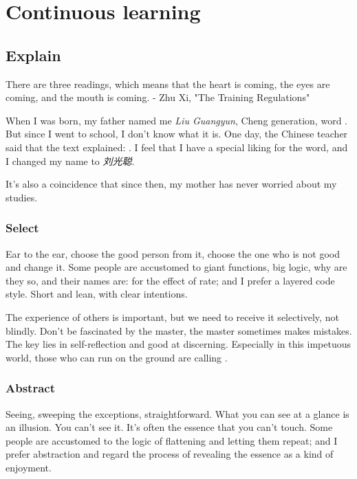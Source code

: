 \chapter{Continuous learning} 
\label{ch:learning}


\section{Explain}
\begin{content}

\begin{remark}
There are three readings, which means that the heart is coming, the eyes are coming, and the mouth is coming. - Zhu Xi, "The Training Regulations"
\end{remark}

When I was born, my father named me \emph{Liu Guangyun}, Cheng  generation, word . But since I went to school, I don’t know what it is. One day, the Chinese teacher said that the text explained: . I feel that I have a special liking for the  word, and I changed my name to \emph{刘光聪}.

It’s also a coincidence that since then, my mother has never worried about my studies.


\subsection{Select}
Ear to the ear, choose the good person from it, choose the one who is not good and change it. Some people are accustomed to giant functions, big logic, why are they so, and their names are: for the effect of  rate; and I prefer a layered code style. Short and lean, with clear intentions.

The experience of others is important, but we need to receive it selectively, not blindly. Don't be fascinated by the master, the master sometimes makes mistakes. The key lies in self-reflection and good at discerning. Especially in this impetuous world, those who can run on the ground are calling .


\subsection{Abstract}
Seeing, sweeping the exceptions, straightforward. What you can see at a glance is an illusion. You can't see it. It's often the essence that you can't touch. Some people are accustomed to the logic of flattening and letting them repeat; and I prefer abstraction and regard the process of revealing the essence as a kind of enjoyment.


\end{content}
